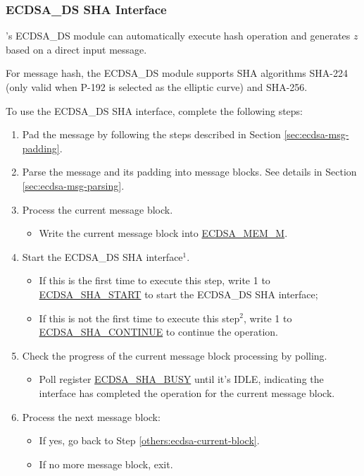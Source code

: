 \documentclass[main\_\_EN.tex]{subfiles}
\begin{document}
\subsubsection{ECDSA\_DS SHA Interface}
\label{sec:ecdsa-sha-interface}
\chipseries{}'s ECDSA\_DS module can automatically execute hash operation and generates $z$ based on a direct input message.

For message hash, the ECDSA\_DS module supports SHA algorithms SHA-224 (only valid when P-192 is selected as the elliptic curve) and SHA-256.

To use the ECDSA\_DS SHA interface, complete the following steps:

\begin{enumerate}
	\item Pad the message by following the steps described in Section \ref{sec:ecdsa-msg-padding}.
	\item Parse the message and its padding into message blocks. See details in Section \ref{sec:ecdsa-msg-parsing}.
	\item \label{others:ecdsa-current-block} Process the current message block.
	      \begin{itemize}
		      \item Write the current message block into \hyperref[tab:ecdsa-memory]{ECDSA\_MEM\_M}.
	      \end{itemize}
	\item Start the ECDSA\_DS SHA interface\hyperref[others:ecdsa-note-sha]{$^1$}.
	      \begin{itemize}
		      \item If this is the first time to execute this step, write 1 to \hyperref[fielddesc:ECDSASHASTART]{ECDSA\_SHA\_START} to start the ECDSA\_DS SHA interface;
		      \item If this is not the first time to execute this step\hyperref[others:ecdsa-note-sha]{$^2$}, write 1 to \hyperref[fielddesc:ECDSASHACONTINUE]{ECDSA\_SHA\_CONTINUE} to continue the operation.
	      \end{itemize}
	\item Check the progress of the current message block processing by polling.
	      \begin{itemize}
		      \item Poll register \hyperref[fielddesc:ECDSASHABUSY]{ECDSA\_SHA\_BUSY} until it's IDLE, indicating the interface has completed the operation for the current message block.
	      \end{itemize}

	\item Process the next message block:
	      \begin{itemize}
		      \item If yes, go back to Step \ref{others:ecdsa-current-block}.
		      \item If no more message block, exit.
	      \end{itemize}

\end{enumerate}
\end{document}
